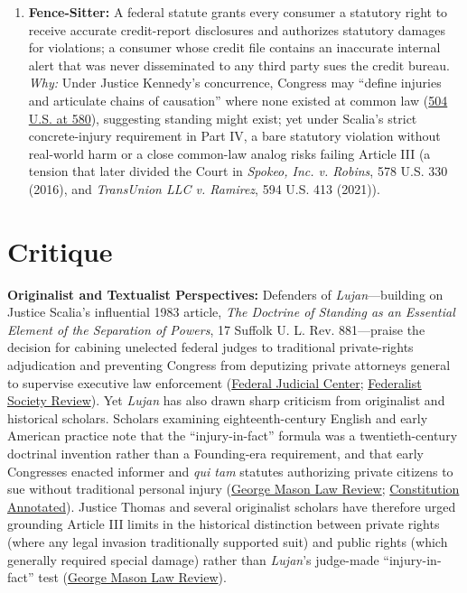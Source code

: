 \documentclass[12pt]{article}
\begin{document}
\begin{enumerate}
\item \textbf{Fence-Sitter:} A federal statute grants every consumer a statutory right to receive accurate credit-report disclosures and authorizes statutory damages for violations; a consumer whose credit file contains an inaccurate internal alert that was never disseminated to any third party sues the credit bureau. \textit{Why:} Under Justice Kennedy's concurrence, Congress may ``define injuries and articulate chains of causation'' where none existed at common law (\href{https://supreme.justia.com/cases/federal/us/504/555/}{504 U.S. at 580}), suggesting standing might exist; yet under Scalia's strict concrete-injury requirement in Part IV, a bare statutory violation without real-world harm or a close common-law analog risks failing Article III (a tension that later divided the Court in \textit{Spokeo, Inc. v. Robins}, 578 U.S. 330 (2016), and \textit{TransUnion LLC v. Ramirez}, 594 U.S. 413 (2021)).
\end{enumerate}

\section{Critique}
\textbf{Originalist and Textualist Perspectives:} Defenders of \textit{Lujan}---building on Justice Scalia's influential 1983 article, \textit{The Doctrine of Standing as an Essential Element of the Separation of Powers}, 17 Suffolk U. L. Rev. 881---praise the decision for cabining unelected federal judges to traditional private-rights adjudication and preventing Congress from deputizing private attorneys general to supervise executive law enforcement (\href{https://www.fjc.gov/history/cases/cases-that-shaped-the-federal-courts/lujan-v-defenders-wildlife}{Federal Judicial Center}; \href{https://fedsoc.org/fedsoc-review/transunion-article-iii-and-expanding-the-judicial-role}{Federalist Society Review}). Yet \textit{Lujan} has also drawn sharp criticism from originalist and historical scholars. Scholars examining eighteenth-century English and early American practice note that the ``injury-in-fact'' formula was a twentieth-century doctrinal invention rather than a Founding-era requirement, and that early Congresses enacted informer and \textit{qui tam} statutes authorizing private citizens to sue without traditional personal injury (\href{https://lawreview.gmu.edu/print__issues/charting-a-course-past-spokeo-and-transunion/}{George Mason Law Review}; \href{https://constitution.congress.gov/browse/essay/artIII-S2-C1-6-2/ALDE_00012993/}{Constitution Annotated}). Justice Thomas and several originalist scholars have therefore urged grounding Article III limits in the historical distinction between private rights (where any legal invasion traditionally supported suit) and public rights (which generally required special damage) rather than \textit{Lujan}'s judge-made ``injury-in-fact'' test (\href{https://lawreview.gmu.edu/print__issues/charting-a-course-past-spokeo-and-transunion/}{George Mason Law Review}).
\end{document}
